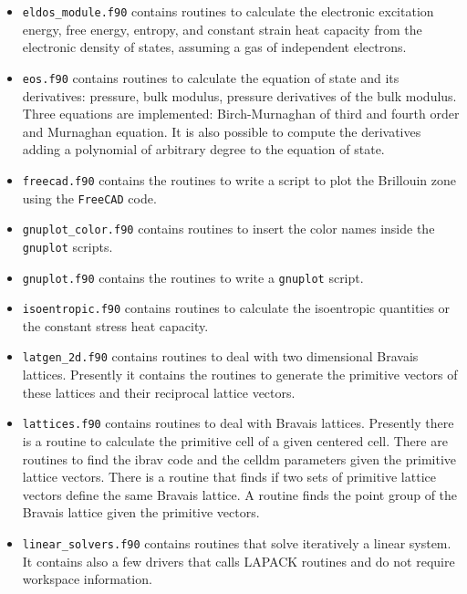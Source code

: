 \documentclass[12pt,a4paper,twoside]{report}
\begin{document}
\begin{itemize}
\item
\texttt{eldos\_module.f90} contains routines to calculate the electronic
excitation energy, free energy, entropy, and constant strain heat capacity
from the electronic density of states, assuming a gas of independent 
electrons.   

\item
\texttt{eos.f90} contains routines to calculate the equation of state and
its derivatives: pressure, bulk modulus, pressure derivatives of the bulk
modulus. Three equations are implemented: Birch-Murnaghan of third
and fourth order and Murnaghan equation. It is also possible to compute
the derivatives adding a polynomial of arbitrary degree to the equation
of state.

\item
\texttt{freecad.f90} contains the routines to write a script to plot the
Brillouin zone using the \texttt{FreeCAD} code.

\item
\texttt{gnuplot\_color.f90} contains routines to insert the color names
inside the \texttt{gnuplot} scripts.

\item
\texttt{gnuplot.f90} contains the routines to write a \texttt{gnuplot} script.

\item
\texttt{isoentropic.f90} contains routines to calculate the isoentropic
quantities or the constant stress heat capacity.

\item
\texttt{latgen\_2d.f90} contains routines to deal with two dimensional
Bravais lattices. Presently it contains the routines to generate the
primitive vectors of these lattices and their reciprocal lattice vectors.

\item \texttt{lattices.f90} contains routines to deal with Bravais lattices.
Presently there is a routine to calculate the primitive cell of
a given centered cell. There are routines to find the ibrav code and the
celldm parameters given the primitive lattice vectors. There is a routine
that finds if two sets of primitive lattice vectors define the same 
Bravais lattice. A routine finds the point group of the Bravais lattice
given the primitive vectors.

\item
\texttt{linear\_solvers.f90} contains routines that solve iteratively
a linear system. It contains also a few drivers that calls LAPACK routines
and do not require workspace information. 


\end{itemize}
\end{document}
